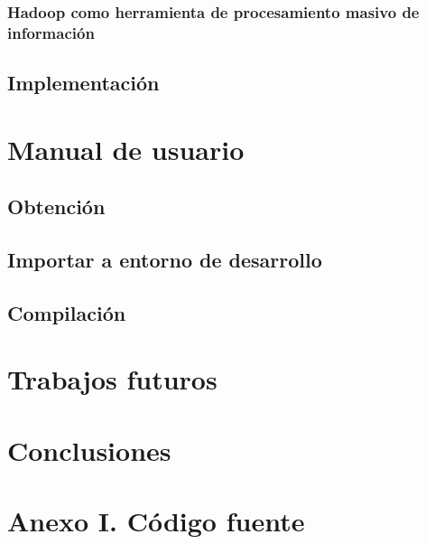 \documentclass{estilos-y-libreria}
\begin{document}
		\subsection{Hadoop como herramienta de procesamiento masivo de informaci\'on}
	\section{Implementaci\'on}

\chapter{Manual de usuario}
	\section{Obtenci\'on}
		
	\section{Importar a entorno de desarrollo}
		
	\section{Compilaci\'on}
		

\chapter{Trabajos futuros}

\chapter{Conclusiones}

\chapter{Anexo I. C\'odigo fuente}

\end{document}
